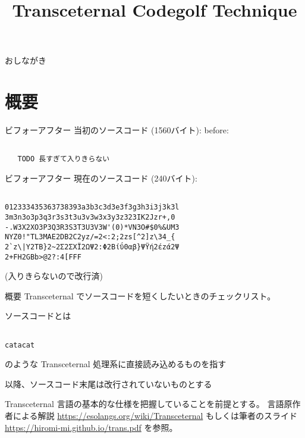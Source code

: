 \documentclass[12pt,unicode]{beamer}
\title{Transceternal Codegolf Technique}
\begin{document}
\begin{frame}
   \titlepage{}
\end{frame}

\begin{frame}{おしながき}
   \tableofcontents
\end{frame}
\section{概要}

\begin{frame}[fragile]{ビフォーアフター}
   当初のソースコード (1560バイト):
   before:
   \begin{verbatim}

   TODO 長すぎて入りきらない

   \end{verbatim}
\end{frame}
\begin{frame}[fragile]{ビフォーアフター}
   現在のソースコード (240バイト):

   \begin{verbatim}

012333435363738393a3b3c3d3e3f3g3h3i3j3k3l
3m3n3o3p3q3r3s3t3u3v3w3x3y3z323IK2Jzr+,0
-.W3X2XO3P3Q3R3S3T3U3V3W'(0)*VN3O#$0%&UM3
NYZ0!"TL3MAE2DB2C2yz/=2<:2;2zs[^2]z\34_{
2`z\|Υ2ΤB}2~2Σ2ΣΧΪ2ΩΨ2:Φ2Bίΰ0αβ}ΨΫή2έzά2Ψ
2+FH2GBb>@2?:4[FFF
   \end{verbatim}

   (入りきらないので改行済)
\end{frame}

\begin{frame}[fragile]{概要}
Transceternal でソースコードを短くしたいときのチェックリスト。

ソースコードとは

\begin{verbatim}

catacat

\end{verbatim}

のような Transceternal 処理系に直接読み込めるものを指す

以降、ソースコード末尾は改行されていないものとする

   Transceternal 言語の基本的な仕様を把握していることを前提とする。
   言語原作者による解説 \url{https://esolangs.org/wiki/Transceternal}
   もしくは筆者のスライド \url{https://hiromi-mi.github.io/trans.pdf} を参照。

\end{frame}
\end{document}
